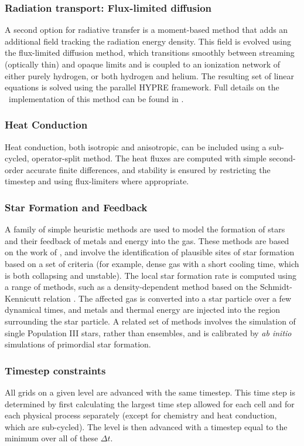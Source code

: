 \subsubsection{Radiation transport: Flux-limited diffusion}

A second option for radiative transfer is a moment-based method that
adds an additional field tracking the radiation energy density.  This
field is evolved using the flux-limited diffusion method, which
transitions smoothly between streaming (optically thin) and opaque
limits and is coupled to an ionization network of either purely
hydrogen, or both hydrogen and helium.  The
resulting set of linear equations is solved using the parallel HYPRE
framework.  Full details on the \enzo\ implementation of this method
can be found in \citet{ReynoldsHayesPaschosNorman2009}.

\subsubsection{Heat Conduction}

Heat conduction, both isotropic and anisotropic, can be included using
a sub-cycled, operator-split method.  The heat fluxes are computed
with simple second-order accurate finite differences, and stability is
ensured by restricting the timestep and using flux-limiters where
appropriate.

\subsubsection{Star Formation and Feedback}

A family of simple heuristic methods are used to model the formation
of stars and their feedback of metals and energy into the gas.  These
methods are based on the work of \citet{CO1992}, and involve the
identification of plausible sites of star formation based on a set of
criteria (for example, dense gas with a short cooling time, which is
both collapsing and unstable).  The local star formation rate is
computed using a range of methods, such as a density-dependent method
based on the Schmidt-Kennicutt relation \citep{K89}.  The affected gas
is converted into a star particle over a few dynamical times, and
metals and thermal energy are injected into the region surrounding the
star particle.  A related set of methods involves the simulation of
single Population III stars, rather than ensembles, and is calibrated
by \textit{ab initio} simulations of primordial star formation.

\subsubsection{Timestep constraints}

All grids on a given level are advanced with the same timestep.  This
time step is determined by first calculating the largest time step
allowed for each cell and for each physical process separately (except
for chemistry and heat conduction, which are sub-cycled).  The level
is then advanced with a timestep equal to the minimum over all of
these $\Delta t$.

